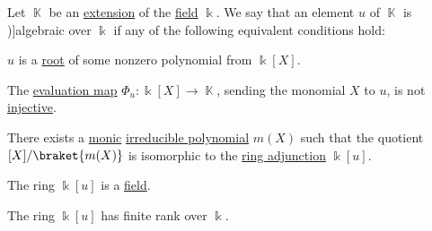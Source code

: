 \begin{definition}\label{def:algebraic_element}
  Let \( \BbbK \) be an \hyperref[def:field/submodel]{extension} of the \hyperref[def:field]{field} \( \Bbbk \). We say that an element \( u \) of \( \BbbK \) is \term[ru=алгебрический (елемент) (\cite[407]{Винберг2014Алгебра})]{algebraic} over \( \Bbbk \) if any of the following equivalent conditions hold:
  \begin{thmenum}
     \( u \) is a \hyperref[def:polynomial_root]{root} of some nonzero polynomial from \( \Bbbk[X] \).

     The \hyperref[con:substitution_homomorphism]{evaluation map} \( \Phi_u: \Bbbk[X] \to \BbbK \), sending the monomial \( X \) to \( u \), is not \hyperref[def:function_invertibility/injective]{injective}.

     There exists a \hyperref[def:monic_polynomial]{monic} \hyperref[def:domain_divisibility/irreducible]{irreducible polynomial} \( m(X) \) such that the quotient \( \Bbbk[X] / \braket{ m(X) } \) is isomorphic to the \hyperref[def:semiring_adjunction]{ring adjunction} \( \Bbbk[u] \).

     The ring \( \Bbbk[u] \) is a \hyperref[def:field]{field}.

     The ring \( \Bbbk[u] \) has finite rank over \( \Bbbk \).
  \end{thmenum}
\end{definition}
